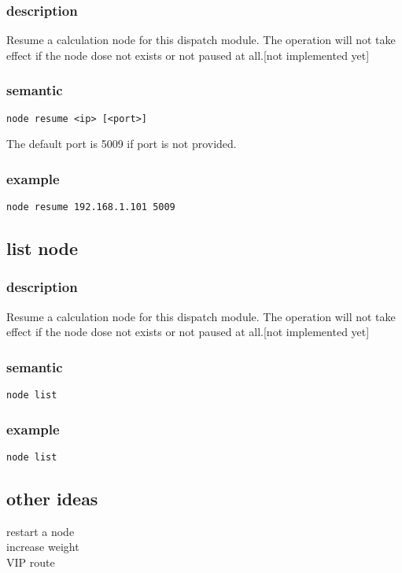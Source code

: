 \documentclass[10pt]{article}
\begin{document}
\subsubsection{description}
Resume a calculation node for this dispatch module. The operation will not take effect if the node 
dose not exists or not paused at all.[not implemented yet]

\subsubsection{semantic}
\begin{verbatim}
node resume <ip> [<port>]
\end{verbatim}
The default port is 5009 if port is not provided.

\subsubsection{example}
\begin{verbatim}
node resume 192.168.1.101 5009
\end{verbatim}

\subsection{list node}
\subsubsection{description}
Resume a calculation node for this dispatch module. The operation will not take effect if the node 
dose not exists or not paused at all.[not implemented yet]

\subsubsection{semantic}
\begin{verbatim}
node list
\end{verbatim}

\subsubsection{example}
\begin{verbatim}
node list
\end{verbatim}

\subsection{other ideas}
restart a node\\
increase weight\\
VIP route\\
\end{document}
